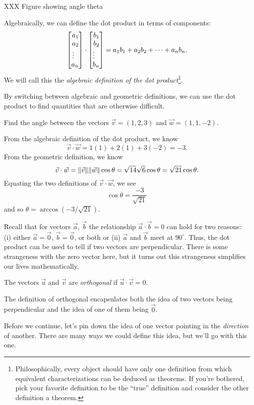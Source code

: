 XXX Figure showing angle theta

Algebraically, we can define the dot product in terms of components:
\[
	\mat{a_1\\a_2\\\vdots\,\,\,\, \\a_n}\cdot \mat{b_1\\b_2\\\vdots\,\,\,\,\\b_n}
	=a_1b_1+a_2b_2+\cdots+a_nb_n.
\]
We will call this the \emph{algebraic definition of the dot product}\footnote{
	Philosophically,
every object should have only one definition from which equivalent characterizations
can be deduced as theorems.  If you're bothered, pick your favorite definition
to be the ``true'' definition and consider the other definition a theorem.
}.

By switching between algebraic and geometric definitions, we can use the dot
product to find quantities that are otherwise difficult.
\begin{example}
	Find the angle between the vectors $\vec v=(1,2,3)$ and $\vec w=(1,1,-2)$.

	From the algebraic definition of the dot product, we know
	\[
		\vec v\cdot \vec w = 1(1)+2(1)+3(-2) = -3.
	\]
	From the geometric definition, we know
	\[
		\vec v\cdot \vec w=\lVert\vec v\rVert\lVert\vec w\rVert\cos\theta
		=\sqrt{14}\sqrt{6}\cos\theta=\sqrt{21}\cos\theta.
	\]
	Equating the two definitions of $\vec v\cdot \vec w$, we see
	\[
		\cos\theta = \frac{-3}{\sqrt{21}}
	\]
	and so $\theta=\arccos(-3/\sqrt{21})$.
\end{example}

Recall that for vectors $\vec a$, $\vec b$ the relationship $\vec a\cdot \vec b=0$
can hold for two reasons: (i) either $\vec a=\vec 0$, $\vec b=\vec 0$, or both
or (ii) $\vec a$ and $\vec b$ meet at $90^{\circ}$.  Thus, the dot product
can be used to tell if two vectors are perpendicular.  There is some strangeness
with the zero vector here, but it turns out this strangeness simplifies our lives
mathematically.

\begin{definition}[Orthogonal]
	The vectors $\vec u$ and $\vec v$ are \emph{orthogonal}
	if $\vec u\cdot\vec v=0$.
\end{definition}

The definition of orthogonal encapsulates both the idea of two vectors being
perpendicular and the idea of one of them being $\vec 0$.

Before we continue, let's pin down the idea of one vector pointing
in the \emph{direction} of another.  There are many ways we could define
this idea, but we'll go with this one.


